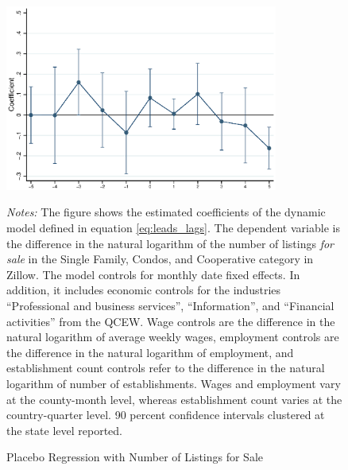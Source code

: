 \begin{figure}[htb!]\centering
	\caption{Placebo Regression with Number of Listings for Sale}
	\label{fig:placebo_nlist}
	\includegraphics[width = 0.8\textwidth]{../../analysis/first_differences_nlist/output/fd_placebo.eps}	
	\begin{minipage}{0.95\textwidth}\footnotesize
		\textit{Notes:} The figure shows the estimated coefficients of the dynamic model defined 
		in equation \autoref{eq:leads_lags}. The dependent variable is the difference in the natural 
		logarithm of the number of listings \textit{for sale} in the Single Family, Condos, and 
		Cooperative category in Zillow. The model controls for monthly date fixed effects. In 
		addition, it includes economic controls for the industries ``Professional and business 
		services'', ``Information'', and ``Financial activities'' from the QCEW. Wage controls 
		are the difference in the natural logarithm of average weekly wages, employment controls are 
		the difference in the natural logarithm of employment, and establishment count controls refer 
		to the difference in the natural logarithm of number of establishments. Wages and employment 
		vary at the county-month level,	whereas establishment count varies at the country-quarter 
		level. 90 percent confidence intervals clustered at the state level reported. 
	\end{minipage}
\end{figure}

